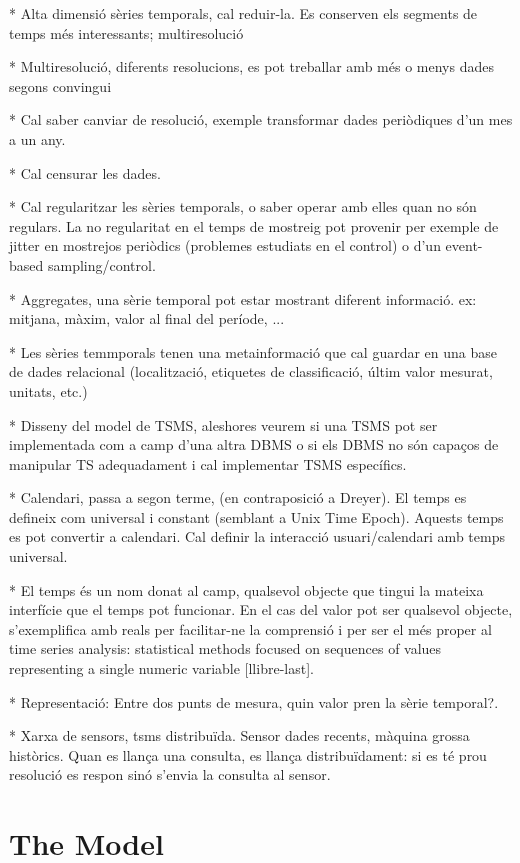 \documentclass{scrartcl}
\begin{document}
* Alta dimensió sèries temporals, cal reduir-la. Es conserven els segments de temps més interessants; multiresolució

* Multiresolució, diferents resolucions, es pot treballar amb més o menys dades segons convingui

* Cal saber canviar de resolució, exemple transformar dades periòdiques d'un mes a un any.

* Cal censurar les dades.

* Cal regularitzar les sèries temporals, o saber operar amb elles quan no són regulars. La no regularitat en el temps de mostreig pot provenir per exemple de jitter en mostrejos periòdics (problemes estudiats en el control) o d'un event-based sampling/control.


* Aggregates, una sèrie temporal pot estar mostrant diferent informació. ex: mitjana, màxim, valor al final del període, ...

* Les sèries temmporals tenen una metainformació que cal guardar en una base de dades relacional (localització, etiquetes de classificació, últim valor mesurat, unitats, etc.)

* Disseny del model de TSMS, aleshores veurem si una TSMS pot ser implementada com a camp d'una altra DBMS o si els DBMS no són capaços de manipular TS adequadament i cal implementar TSMS específics.

* Calendari, passa a segon terme, (en contraposició a Dreyer). El temps es defineix com universal i constant (semblant a Unix Time Epoch). Aquests temps es pot convertir a calendari. Cal definir la interacció usuari/calendari amb temps universal.

* El temps és un nom donat al camp, qualsevol objecte que tingui la mateixa interfície que el temps pot funcionar. En el cas del valor pot ser qualsevol objecte, s'exemplifica amb reals per facilitar-ne la comprensió i per ser el més proper al time series analysis: statistical methods focused on sequences of values representing a single numeric variable [llibre-last].


* Representació: Entre dos punts de mesura, quin valor pren la sèrie temporal?.


* Xarxa de sensors, tsms distribuïda. Sensor dades recents, màquina grossa històrics. Quan es llança una consulta, es llança distribuïdament: si es té prou resolució es respon sinó s'envia la consulta al sensor. 




\section{The Model}
\end{document}
